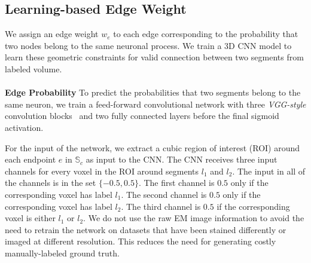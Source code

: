 \subsection{Learning-based Edge Weight}
\label{sec:edge-weights}
We assign an edge weight $w_e$ to each edge corresponding to the probability that two nodes belong to the same neuronal process.
We train a 3D CNN model to learn these geometric constraints for valid connection between two segments from labeled volume.
\\~\\
\noindent\textbf{Edge Probability}
To predict the probabilities that two segments belong to the same neuron, we train a feed-forward convolutional network with three \textit{VGG-style} convolution blocks~\cite{chatfield2014return} and two fully connected layers before the final sigmoid activation. 

For the input of the network, we extract a cubic region of interest (ROI) around each endpoint $e$ in $\mathbb{S}_c$ as input to the CNN. 
The CNN receives three input channels for every voxel in the ROI around segments $l_1$ and $l_2$. 
The input in all of the channels is in the set $\{-0.5, 0.5\}$. 
The first channel is $0.5$ only if the corresponding voxel has label $l_1$. 
The second channel is $0.5$ only if the corresponding voxel has label $l_2$. 
The third channel is $0.5$ if the corresponding voxel is either $l_1$ or $l_2$.
We do not use the raw EM image information to avoid the need to retrain the network on datasets that have been stained differently or imaged at different resolution. 
This reduces the need for generating costly manually-labeled ground truth. 

